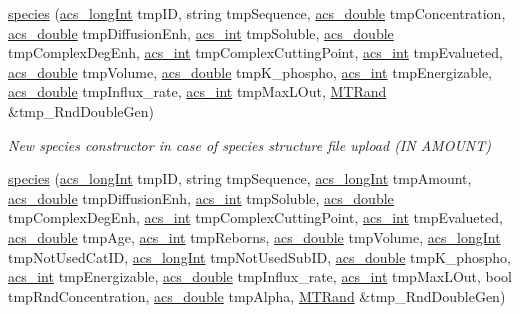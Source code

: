 \begin{DoxyCompactItemize}
\hyperlink{a00022_a9edc001dbe4ccc7f72571d50ae10319a}{species} (\hyperlink{a00024_a19319d75f02db4308bc5c0026d98cd85}{acs\-\_\-long\-Int} tmp\-I\-D, string tmp\-Sequence, \hyperlink{a00024_ab776853a005fcbf56af0424a2a4dd607}{acs\-\_\-double} tmp\-Concentration, \hyperlink{a00024_ab776853a005fcbf56af0424a2a4dd607}{acs\-\_\-double} tmp\-Diffusion\-Enh, \hyperlink{a00024_a8d277355641a098190360234e2ebde35}{acs\-\_\-int} tmp\-Soluble, \hyperlink{a00024_ab776853a005fcbf56af0424a2a4dd607}{acs\-\_\-double} tmp\-Complex\-Deg\-Enh, \hyperlink{a00024_a8d277355641a098190360234e2ebde35}{acs\-\_\-int} tmp\-Complex\-Cutting\-Point, \hyperlink{a00024_a8d277355641a098190360234e2ebde35}{acs\-\_\-int} tmp\-Evalueted, \hyperlink{a00024_ab776853a005fcbf56af0424a2a4dd607}{acs\-\_\-double} tmp\-Volume, \hyperlink{a00024_ab776853a005fcbf56af0424a2a4dd607}{acs\-\_\-double} tmp\-K\-\_\-phospho, \hyperlink{a00024_a8d277355641a098190360234e2ebde35}{acs\-\_\-int} tmp\-Energizable, \hyperlink{a00024_ab776853a005fcbf56af0424a2a4dd607}{acs\-\_\-double} tmp\-Influx\-\_\-rate, \hyperlink{a00024_a8d277355641a098190360234e2ebde35}{acs\-\_\-int} tmp\-Max\-L\-Out, \hyperlink{a00016}{M\-T\-Rand} \&tmp\-\_\-\-Rnd\-Double\-Gen)
\begin{DoxyCompactList}\small\item\em New species constructor in case of species structure file upload (I\-N A\-M\-O\-U\-N\-T) \end{DoxyCompactList}\item 
\hyperlink{a00022_ad882db7ec81c574df6c03770d506e064}{species} (\hyperlink{a00024_a19319d75f02db4308bc5c0026d98cd85}{acs\-\_\-long\-Int} tmp\-I\-D, string tmp\-Sequence, \hyperlink{a00024_a19319d75f02db4308bc5c0026d98cd85}{acs\-\_\-long\-Int} tmp\-Amount, \hyperlink{a00024_ab776853a005fcbf56af0424a2a4dd607}{acs\-\_\-double} tmp\-Diffusion\-Enh, \hyperlink{a00024_a8d277355641a098190360234e2ebde35}{acs\-\_\-int} tmp\-Soluble, \hyperlink{a00024_ab776853a005fcbf56af0424a2a4dd607}{acs\-\_\-double} tmp\-Complex\-Deg\-Enh, \hyperlink{a00024_a8d277355641a098190360234e2ebde35}{acs\-\_\-int} tmp\-Complex\-Cutting\-Point, \hyperlink{a00024_a8d277355641a098190360234e2ebde35}{acs\-\_\-int} tmp\-Evalueted, \hyperlink{a00024_ab776853a005fcbf56af0424a2a4dd607}{acs\-\_\-double} tmp\-Age, \hyperlink{a00024_a8d277355641a098190360234e2ebde35}{acs\-\_\-int} tmp\-Reborns, \hyperlink{a00024_ab776853a005fcbf56af0424a2a4dd607}{acs\-\_\-double} tmp\-Volume, \hyperlink{a00024_a19319d75f02db4308bc5c0026d98cd85}{acs\-\_\-long\-Int} tmp\-Not\-Used\-Cat\-I\-D, \hyperlink{a00024_a19319d75f02db4308bc5c0026d98cd85}{acs\-\_\-long\-Int} tmp\-Not\-Used\-Sub\-I\-D, \hyperlink{a00024_ab776853a005fcbf56af0424a2a4dd607}{acs\-\_\-double} tmp\-K\-\_\-phospho, \hyperlink{a00024_a8d277355641a098190360234e2ebde35}{acs\-\_\-int} tmp\-Energizable, \hyperlink{a00024_ab776853a005fcbf56af0424a2a4dd607}{acs\-\_\-double} tmp\-Influx\-\_\-rate, \hyperlink{a00024_a8d277355641a098190360234e2ebde35}{acs\-\_\-int} tmp\-Max\-L\-Out, bool tmp\-Rnd\-Concentration, \hyperlink{a00024_ab776853a005fcbf56af0424a2a4dd607}{acs\-\_\-double} tmp\-Alpha, \hyperlink{a00016}{M\-T\-Rand} \&tmp\-\_\-\-Rnd\-Double\-Gen)

\end{DoxyCompactItemize}
